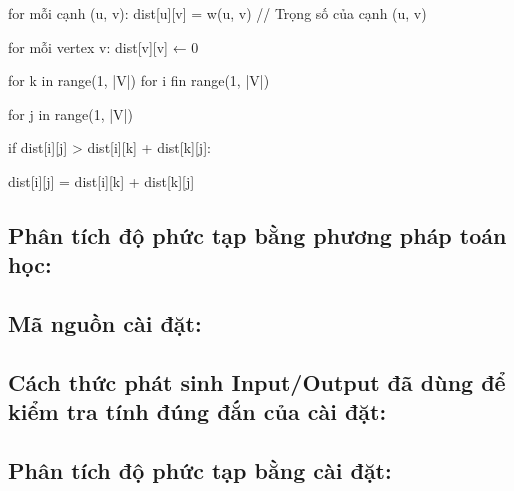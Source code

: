 \documentclass{article}
\begin{document}
    for mỗi cạnh (u, v):
\hangindent=1cm
\newline
    dist[u][v] = w(u, v)  // Trọng số của cạnh (u, v)
\noindent

for mỗi vertex v:
\hangindent=1cm
\newline
    dist[v][v] ← 0
\noindent

for k in range(1, |V|)
\hangindent=1cm
\newline
for i fin range(1, |V|)

\setlength{\parindent}{40pt}
for j in range(1, |V|)

\setlength{\parindent}{50pt}
            if dist[i][j] > dist[i][k] + dist[k][j]:
\setlength{\parindent}{60pt}

                dist[i][j] = dist[i][k] + dist[k][j]


\subsection{Phân tích độ phức tạp bằng phương pháp toán học:}
\subsection{Mã nguồn cài đặt:}
\subsection{Cách thức phát sinh Input/Output đã dùng để kiểm tra tính đúng đắn của cài đặt:}
\subsection{Phân tích độ phức tạp bằng cài đặt:}
\end{document}
